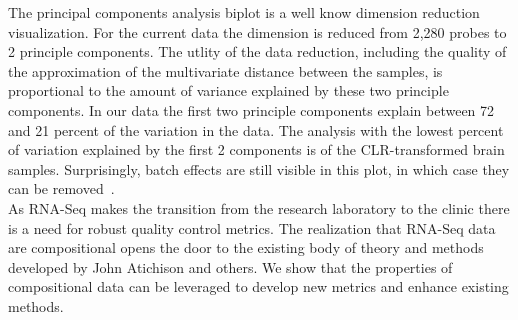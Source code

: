 \documentclass{article}\usepackage[]{graphicx}\usepackage[]{color}
\theoremstyle{definition}
\begin{document}
The principal components analysis biplot is a well know dimension reduction visualization.  For the current data the dimension is reduced from 2,280 probes to 2 principle components.  The utlity of the data reduction, including the quality of the approximation of the multivariate distance between the samples, is proportional to the amount of variance explained by these two principle components. In our data the first two principle components explain between 72 and 21 percent of the variation in the data.  The analysis with the lowest percent of variation explained by the first 2 components is of the CLR-transformed brain samples.  Surprisingly, batch effects are still visible in this plot, in which case they can be removed~\cite{Luo2010}.  \\

As RNA-Seq makes the transition from the research laboratory to the clinic there is a need for robust quality control metrics.  The realization that RNA-Seq data are compositional opens the door to the existing body of theory and methods developed by John Atichison and others.  We show that the properties of compositional data can be leveraged to develop new metrics and enhance existing methods.\\


\newpage
\printbibliography
\end{document}
